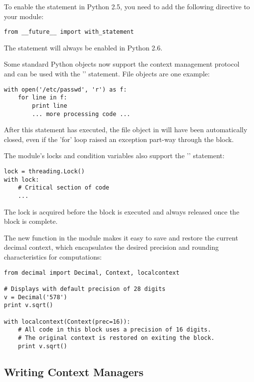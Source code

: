 \documentclass{howto}
\begin{document}
To enable the statement in Python 2.5, you need 
to add the following directive to your module:

\begin{verbatim}
from __future__ import with_statement
\end{verbatim}

The statement will always be enabled in Python 2.6.

Some standard Python objects now support the context management
protocol and can be used with the '' statement. File
objects are one example:

\begin{verbatim}
with open('/etc/passwd', 'r') as f:
    for line in f:
        print line
        ... more processing code ...
\end{verbatim}

After this statement has executed, the file object in  will
have been automatically closed, even if the 'for' loop
raised an exception part-way through the block.

The  module's locks and condition variables 
also support the '' statement:

\begin{verbatim}
lock = threading.Lock()
with lock:
    # Critical section of code
    ...
\end{verbatim}

The lock is acquired before the block is executed and always released once 
the block is complete.

The new  function in the  module
makes it easy to save and restore the current decimal context, which
encapsulates the desired precision and rounding characteristics for
computations:

\begin{verbatim}
from decimal import Decimal, Context, localcontext

# Displays with default precision of 28 digits
v = Decimal('578')
print v.sqrt()

with localcontext(Context(prec=16)):
    # All code in this block uses a precision of 16 digits.
    # The original context is restored on exiting the block.
    print v.sqrt()
\end{verbatim}

\subsection{Writing Context Managers\label{context-managers}}
\end{document}
